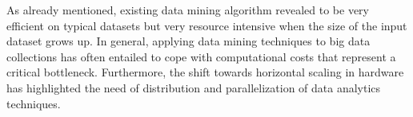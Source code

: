 As already mentioned, existing data mining algorithm revealed to be very efficient on typical datasets but
very resource intensive when the size of the input dataset grows up. In general,
applying data mining techniques to big data collections has often entailed to
cope with computational costs that represent a critical bottleneck. Furthermore,
the shift towards horizontal scaling in hardware has highlighted the need of
distribution and parallelization of data analytics techniques. 

